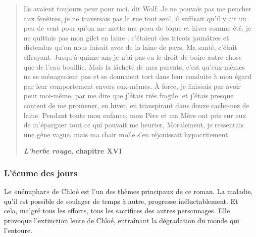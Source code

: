 \begin{quotation}
Ils avaient toujours peur pour moi, dit Wolf. Je ne pou­vais pas me pencher aux fenêtres,
je ne traversais pas la rue tout seul, il suffi­sait qu'il y ait un peu de vent pour qu'on
me mette ma peau de bique et hiver comme été, je ne quittais pas mon gilet en laine ;
c’étaient des tricots jaunâtres et distendus qu’on nous faisait avec de la laine de pays.
Ma santé, c’était effrayant. Jus­qu’à quinze ans je n’ai pas eu le droit de boire autre chose
que de l’eau bouillie. Mais la lâcheté de mes parents, c’est qu’eux-mêmes ne se ménageaient
pas et se donnaient tort dans leur conduite à mon égard par leur comportement envers eux-mêmes.
À force, je finis­sais par avoir peur moi-même, par me dire que j’étais très fragile, et j’étais
presque content de me promener, en hiver, en transpirant dans douze cache-nez de laine. Pendant
toute mon enfance, mon Père et ma Mère ont pris sur eux de m’épargner tout ce qui pouvait me
heurter. Mo­ra­le­ment, je ressentais une gêne vague, mais ma chair molle s’en ré­jouis­sait
hypocritement.

{\bf \emph{L'herbe rouge}, chapitre XVI}
\end{quotation}


\subsubsection{L'écume des jours}
Le «nénuphar» de Chloé est l'un des thèmes principaux
de ce roman. La maladie, qu'il est possible de soulager de temps à autre,
progresse inéluctablement. Et cela, malgré tous les efforts, tous les
sacrifices des autres personnages. Elle provoque l'extinction lente
de Chloé, entraînant la dégradation du monde qui l'entoure.


